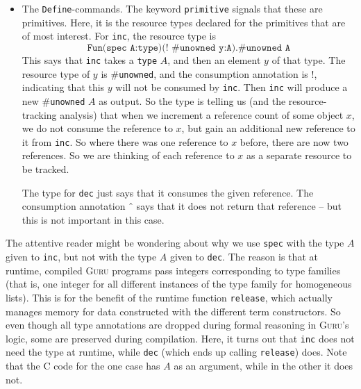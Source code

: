 \documentclass[9pt,natbib]{sigplanconf}
\begin{document}
\begin{itemize}
\item The \texttt{Define}-commands.  The keyword \texttt{primitive}
signals that these are primitives.  Here, it is the resource types declared for
the primitives that are of most interest.  For \texttt{inc}, the resource type
is
\[
\texttt{Fun(spec A:type)(! \#unowned y:A).\#unowned A}
\]
\noindent This says that \texttt{inc} takes a \texttt{type} $A$, and
then an element $y$ of that type.  The resource type of $y$ is
\#\texttt{unowned}, and the consumption annotation is $!$, indicating
that this $y$ will not be consumed by \texttt{inc}.  Then \texttt{inc}
will produce a new \#\texttt{unowned} $A$ as output.  So the type is
telling us (and the resource-tracking analysis) that when we increment
a reference count of some object $x$, we do not consume the reference
to $x$, but gain an additional new reference to it from \texttt{inc}.
So where there was one reference to $x$ before, there are now two
references.  So we are thinking of each reference to $x$ as a separate
resource to be tracked.

The type for \texttt{dec} just says that it consumes the given
reference.  The consumption annotation \^{\ } says that it does not
return that reference -- but this is not important in this case.

\end{itemize}

The attentive reader might be wondering about why we use \texttt{spec}
with the type $A$ given to \texttt{inc}, but not with the type $A$
given to \texttt{dec}.  The reason is that at runtime, compiled
\textsc{Guru} programs pass integers corresponding to type families
(that is, one integer for all different instances of the type family
for homogeneous lists).  This is for the benefit of the runtime
function \texttt{release}, which actually manages memory for data
constructed with the different term constructors.  So even though all
type annotations are dropped during formal reasoning in
\textsc{Guru}'s logic, some are preserved during compilation.  Here,
it turns out that \texttt{inc} does not need the type at runtime,
while \texttt{dec} (which ends up calling \texttt{release}) does.
Note that the C code for the one case has $A$ as an argument, while
in the other it does not. 
\end{document}

